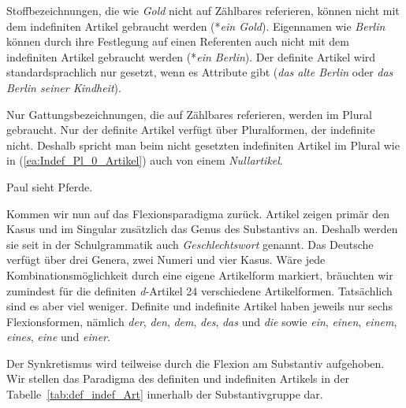 Stoffbezeichnungen, die wie \textit{Gold} nicht auf Zählbares referieren, können nicht mit dem indefiniten Artikel gebraucht werden (*\textit{ein Gold}). Eigennamen wie \textit{Berlin} können durch ihre Festlegung auf einen Referenten auch nicht mit dem indefiniten Artikel gebraucht werden (*\textit{ein Berlin}). Der definite Artikel wird standardsprachlich nur gesetzt, wenn es Attribute gibt (\textit{das alte Berlin} oder \textit{das Berlin seiner Kindheit}).

Nur Gattungsbezeichnungen, die auf Zählbares referieren, werden im Plural gebraucht. Nur der definite Artikel verfügt über Pluralformen, der indefinite nicht. Deshalb spricht man beim nicht gesetzten indefiniten Artikel im Plural wie in (\ref{ea:Indef_Pl_0_Artikel}) auch von einem \textit{Nullartikel}.

\ea \label{ea:Indef_Pl_0_Artikel} Paul sieht Pferde.
\z 


Kommen wir nun auf das Flexionsparadigma zurück. Artikel zeigen primär den Kasus und im Singular zusätzlich das Genus des Substantivs an. Deshalb werden sie seit \citet[201]{Suetterlin1907} in der Schulgrammatik auch  \textit{Geschlechtswort} genannt. Das Deutsche verfügt über drei Genera, zwei Numeri und vier Kasus. Wäre jede Kombinationsmöglichkeit durch eine eigene Artikelform markiert, bräuchten wir zumindest für die definiten \textit{d}-Artikel 24 verschiedene Artikelformen. Tatsächlich sind es aber viel weniger. Definite und indefinite Artikel haben jeweils nur sechs Flexionsformen, nämlich \textit{der}, \textit{den}, \textit{dem}, \textit{des}, \textit{das} und \textit{die} sowie \textit{ein}, \textit{einen}, \textit{einem}, \textit{eines}, \textit{eine} und \textit{einer}. 

Der Synkretismus wird teilweise durch die Flexion am Substantiv aufgehoben. Wir stellen das Paradigma des definiten und indefiniten Artikels in der Tabelle~\ref{tab:def_indef_Art} innerhalb der Substantivgruppe dar.

